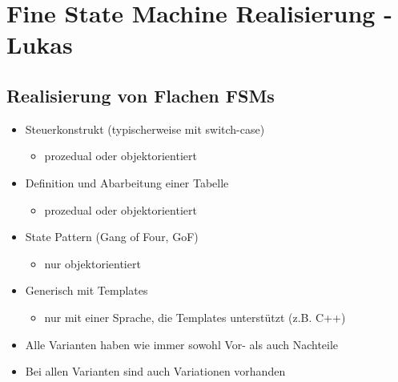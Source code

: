 \section{Fine State Machine Realisierung - Lukas}

\subsection{Realisierung von Flachen FSMs}
\begin{itemize}
  \item Steuerkonstrukt (typischerweise mit switch-case)
  \begin{itemize}
    \item prozedual oder objektorientiert
   \end{itemize}
   \item Definition und Abarbeitung einer Tabelle
  \begin{itemize}
    \item prozedual oder objektorientiert
   \end{itemize}
   \item State Pattern (Gang of Four, GoF)
  \begin{itemize}
    \item nur objektorientiert
   \end{itemize}
   \item Generisch mit Templates
  \begin{itemize}
    \item nur mit einer Sprache, die Templates unterstützt (z.B. C++)
   \end{itemize}
   \item Alle Varianten haben wie immer sowohl Vor- als auch Nachteile
   \item Bei allen Varianten sind auch Variationen vorhanden
\end{itemize}

